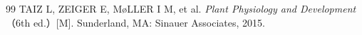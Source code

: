 \documentclass[fontset=fandol]{ctexart}
\begin{document}
\fi



\begin{thebibliography}{99}
 TAIZ L, ZEIGER E, M{\o}LLER I M, et al. \emph{Plant Physiology and Development}（6th ed.）[M]. Sunderland, MA: Sinauer Associates, 2015.
\end{thebibliography}
\end{document}
